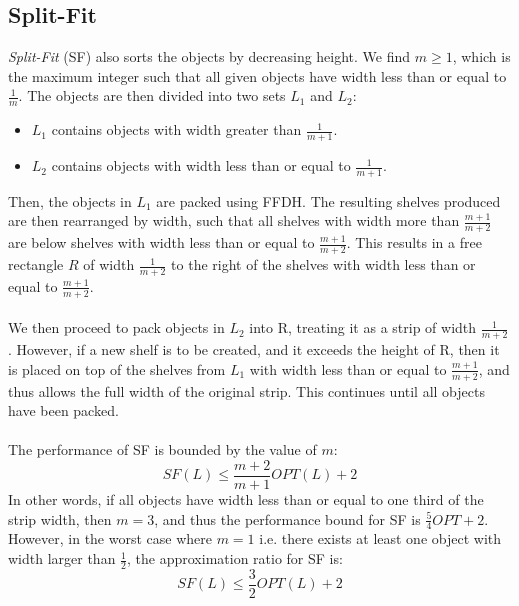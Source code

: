 \documentclass{article}
\begin{document}
\subsection{Split-Fit}
\textit{Split-Fit} (SF) also sorts the objects by decreasing height. We find $m \geq 1$, which is the maximum integer such that all given objects have width less than or equal to $\frac{1}{m}$. The objects are then divided into two sets $L_1$ and $L_2$:
\begin{itemize}
\item $L_1$ contains objects with width greater than $\frac{1}{m+1}$.
\item $L_2$ contains objects with width less than or equal to $\frac{1}{m+1}$.
\end{itemize}
Then, the objects in $L_1$ are packed using FFDH. The resulting shelves produced are then rearranged by width, such that all shelves with width more than $\frac{m+1}{m+2}$ are below shelves with width less than or equal to $\frac{m+1}{m+2}$. This results in a free rectangle $R$ of width $\frac{1}{m+2}$ to the right of the shelves with width less than or equal to $\frac{m+1}{m+2}$.\\
\\
We then proceed to pack objects in $L_2$ into R, treating it as a strip of width $\frac{1}{m+2}$. However, if a new shelf is to be created, and it exceeds the height of R, then it is placed on top of the shelves from $L_1$ with width less than or equal to $\frac{m+1}{m+2}$, and thus allows the full width of the original strip. This continues until all objects have been packed.\\
\\
The performance of SF is bounded by the value of $m$:
\[
	SF(L) \leq \frac{m+2}{m+1}OPT(L) + 2
\]
In other words, if all objects have width less than or equal to one third of the strip width, then $m = 3$, and thus the performance bound for SF is $\frac{5}{4}OPT + 2$. However, in the worst case where $m = 1$ i.e. there exists at least one object with width larger than $\frac{1}{2}$, the approximation ratio for SF is:
\[
	SF(L) \leq \frac{3}{2}OPT(L) + 2
\]
\end{document}
